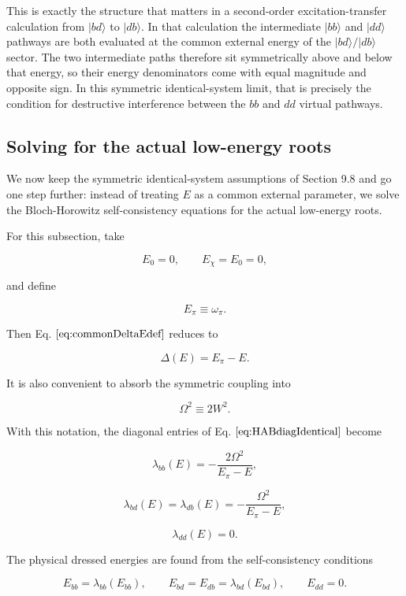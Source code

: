 \documentclass[
]{article}
\renewcommand{\[}{\begin{equation}}
\renewcommand{\]}{\end{equation}}
\begin{document}
This is exactly the structure that matters in a second-order
excitation-transfer calculation from \(|bd\rangle\) to \(|db\rangle\).
In that calculation the intermediate \(|bb\rangle\) and \(|dd\rangle\)
pathways are both evaluated at the common external energy of the
\(|bd\rangle/|db\rangle\) sector. The two intermediate paths therefore
sit symmetrically above and below that energy, so their energy
denominators come with equal magnitude and opposite sign. In this
symmetric identical-system limit, that is precisely the condition for
destructive interference between the \(bb\) and \(dd\) virtual pathways.

\subsection{Solving for the actual low-energy
roots}\label{solving-for-the-actual-low-energy-roots}

We now keep the symmetric identical-system assumptions of Section 9.8
and go one step further: instead of treating \(E\) as a common external
parameter, we solve the Bloch-Horowitz self-consistency equations for
the actual low-energy roots.

For this subsection, take

\[
E_0=0,
\qquad
E_\chi=E_0=0,
\label{eq:E0andEchiZero}
\]

and define

\[
E_\pi \equiv \omega_\pi.
\label{eq:EpiDef}
\]

Then Eq. \(\ref{eq:commonDeltaEdef}\) reduces to

\[
\Delta(E)=E_\pi-E.
\label{eq:DeltaSimple}
\]

It is also convenient to absorb the symmetric coupling into

\[
\Omega^2 \equiv 2W^2.
\label{eq:OmegaDefLast}
\]

With this notation, the diagonal entries of Eq.
\(\ref{eq:HABdiagIdentical}\) become

\[
\lambda_{bb}(E)=-\frac{2\Omega^2}{E_\pi-E},
\label{eq:lambdabbSimple}
\]

\[
\lambda_{bd}(E)=\lambda_{db}(E)=-\frac{\Omega^2}{E_\pi-E},
\label{eq:lambdabdSimple}
\]

\[
\lambda_{dd}(E)=0.
\label{eq:lambdaddSimple}
\]

The physical dressed energies are found from the self-consistency
conditions

\[
E_{bb}=\lambda_{bb}(E_{bb}),
\qquad
E_{bd}=E_{db}=\lambda_{bd}(E_{bd}),
\qquad
E_{dd}=0.
\label{eq:selfConsLast}
\]
\end{document}
